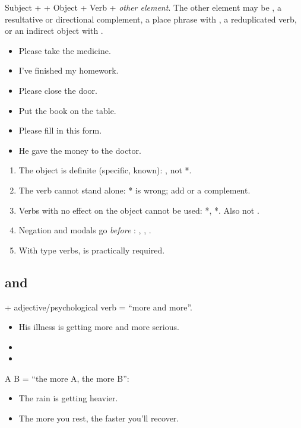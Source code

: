\begin{definition}[\zh{把} sentence]
Subject +  + Object + Verb + \emph{other element}. The other element may be
, a resultative or directional complement, a place phrase with , a
reduplicated verb, or an indirect object with .
\end{definition}

\begin{itemize}
  \item {} Please take the medicine.
  \item {} I've finished my homework.
  \item {} Please close the door.
  \item {} Put the book on the table.
  \item {} Please fill in this form.
  \item {} He gave the money to the doctor.
\end{itemize}

\begin{important}[\zh{把} rules]
\begin{enumerate}
  \item The object is definite (specific, known): , not *.
  \item The verb cannot stand alone: * is wrong; add  or a
        complement.
  \item Verbs with no effect on the object cannot be used: *,
        *. Also not .
  \item Negation and modals go \emph{before} : ,
        , .
  \item With  type verbs,  is practically required.
\end{enumerate}
\end{important}

\subsection{ and }

 + adjective/psychological verb = ``more and more''.
\begin{itemize}
  \item {} His illness is getting more and more serious.
  \item {}
  \item {}
\end{itemize}
 A  B = ``the more A, the more B'':
\begin{itemize}
  \item {} The rain is getting heavier.
  \item {} The more you rest, the faster you'll recover.
\end{itemize}

